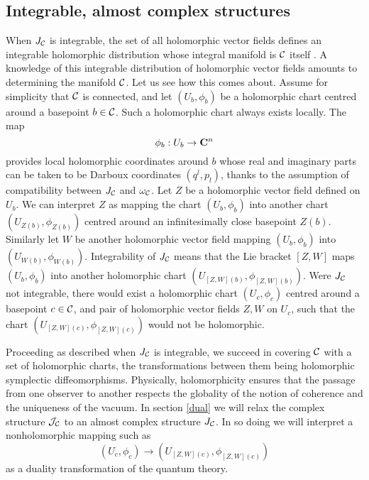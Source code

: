 \documentclass[a4paper,a4paper]{article}
\begin{document}
\subsection{Integrable, almost complex structures}\label{cpsm}

When $J_{\cal C}$ is integrable, the set of all holomorphic vector fields defines 
an integrable holomorphic distribution whose integral manifold is ${\cal C}$ 
itself \cite{KN}. A knowledge of this integrable  distribution
of holomorphic vector fields amounts to determining the manifold ${\cal C}$.
Let us see how this comes about. Assume for simplicity that ${\cal C}$ is connected, 
and let $(U_b, \phi_b)$ be a holomorphic chart centred around a basepoint $b\in {\cal C}$. 
Such a holomorphic chart always exists locally. The map 
\begin{equation}
\phi_b:U_b\rightarrow {\bf C}^{n}
\label{homeo}
\end{equation} 
provides local 
holomorphic coordinates around $b$ whose real and imaginary parts can be taken to be 
Darboux coordinates $(q^l, p_l)$, thanks to the assumption of 
compatibility between $J_{\cal C}$ and $\omega_{\cal C}$. 
Let $Z$ be a holomorphic vector field defined 
on $U_b$. We can interpret $Z$ as mapping the chart $(U_{b}, \phi_{b})$ into 
another chart $(U_{Z(b)}, \phi_{Z(b)})$ centred around an infinitesimally 
close basepoint $Z(b)$. Similarly let $W$ be another holomorphic vector field 
mapping $(U_{b}, \phi_{b})$ into $(U_{W(b)}, \phi_{W(b)})$.
Integrability of $J_{\cal C}$ 
means that the Lie bracket $[Z, W]$ maps $(U_{b}, \phi_{b})$
into another holomorphic chart $(U_{[Z,W](b)}, \phi_{[Z,W](b)})$. 
Were $J_{\cal C}$ not integrable, there would exist a holomorphic chart $(U_c, \phi_c)$ centred
around a basepoint $c\in {\cal C}$, and pair of holomorphic vector 
fields $Z, W$ on $U_c$, such that the chart $(U_{[Z,W](c)}, \phi_{[Z,W](c)})$
would not be holomorphic.

Proceeding as described when $J_{\cal C}$ is integrable, we succeed in covering 
${\cal C}$ with a set of holomorphic charts, the transformations between 
them being holomorphic symplectic diffeomorphisms. Physically, 
holomorphicity ensures that the passage from one observer to another 
respects the globality of the notion of coherence and the 
uniqueness of the vacuum. In section \ref{dual} we will relax the complex 
structure ${\cal J}_{\cal C}$ to an almost complex structure $J_{\cal C}$. 
In so doing we will interpret a nonholomorphic mapping such as 
\begin{equation}
(U_c, \phi_c)\rightarrow (U_{[Z,W](c)}, \phi_{[Z,W](c)})
\label{nonc}
\end{equation}
as a duality transformation of the quantum theory.
\end{document}

